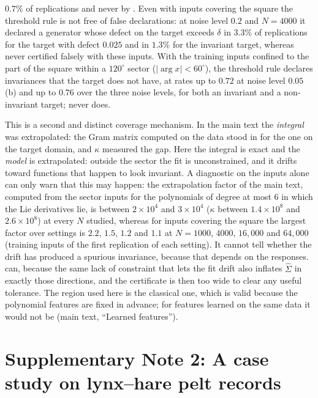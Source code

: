 $0.7\%$ of replications and never by \symcert{}. Even with inputs covering the
square the threshold rule is not free of false declarations: at noise level
$0.2$ and $N = 4000$ it declared a generator whose defect on the target exceeds
$\delta$ in $3.3\%$ of replications for the target with defect $0.025$ and in
$1.3\%$ for the invariant target, whereas \symcert{} never certified falsely
with these inputs. With the training inputs confined to the
part of the square within a $120^\circ$ sector ($|\arg x| < 60^\circ$), the
threshold rule declares invariances that the target does not have, at rates up
to $0.72$ at noise level $0.05$ (\SFinvariance b) and up to $0.76$ over the
three noise levels, for both an invariant and a non-invariant target;
\symcert{} never does.

This is a second and distinct coverage mechanism. In the main text the
\emph{integral} was extrapolated: the Gram matrix computed on the data stood in
for the one on the target domain, and $\kappa$ measured the gap. Here the
integral is exact and the \emph{model} is extrapolated: outside the sector the
fit is unconstrained, and it drifts toward functions that happen to look
invariant. A diagnostic on the inputs alone can only warn that this may
happen: the extrapolation factor of the main text, computed from the sector
inputs for the polynomials of degree at most $6$ in which the Lie derivatives
lie, is between $2\times10^{4}$ and $3\times10^{4}$ ($\kappa$ between
$1.4\times10^{8}$ and $2.6\times10^{8}$) at every $N$ studied, whereas for
inputs covering the square the largest factor over settings is $2.2$, $1.5$,
$1.2$ and $1.1$ at $N = 1000$, $4000$, $16{,}000$ and $64{,}000$ (training inputs
of the first replication of each setting). It cannot tell
whether the drift has produced a spurious invariance, because that depends on
the responses. \symcert{} can,
because the same lack of constraint that lets the fit drift also inflates
$\hat\Sigma$ in exactly those directions, and the certificate is then too wide
to clear any useful tolerance. The region used here is the classical one,
which is valid because the polynomial features are fixed in advance; for
features learned on the same data it would not be (main text, ``Learned
features'').

\section*{Supplementary Note 2: A case study on lynx--hare pelt records}
\label{sn:realdata}

